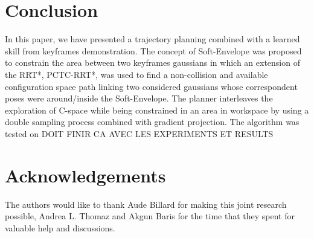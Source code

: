 \documentclass[letterpaper, 10 pt, conference]{ieeeconf}  %
\begin{document}
\section{Conclusion}
In this paper, we have presented a trajectory planning combined with a learned skill from keyframes demonstration. The concept of Soft-Envelope was proposed to constrain the area between two keyframes gaussians in which an extension of the RRT*, PCTC-RRT*, was used to find a non-collision and available configuration space path linking two considered gaussians whose correspondent poses were around/inside the Soft-Envelope. The planner interleaves the exploration of C-space while being constrained in an area in workspace by using a double sampling process combined with gradient projection.
The algorithm was tested on  DOIT FINIR CA AVEC LES EXPERIMENTS ET RESULTS

\section{Acknowledgements}
The authors would like to thank Aude Billard for making this joint research possible, Andrea L. Thomaz and Akgun Baris for the time that they spent for valuable help and discussions.


\end{document}
